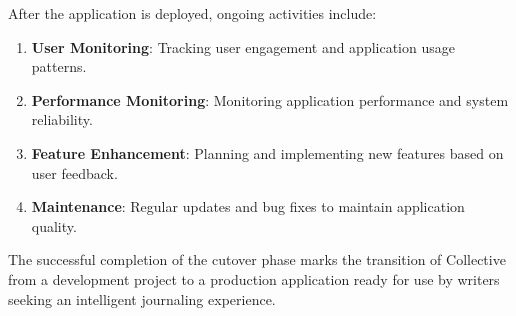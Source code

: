 After the application is deployed, ongoing activities include:

\begin{enumerate}
    \item \textbf{User Monitoring}: Tracking user engagement and application usage patterns.
    
    \item \textbf{Performance Monitoring}: Monitoring application performance and system reliability.
    
    \item \textbf{Feature Enhancement}: Planning and implementing new features based on user feedback.
    
    \item \textbf{Maintenance}: Regular updates and bug fixes to maintain application quality.
\end{enumerate}

The successful completion of the cutover phase marks the transition of Collective from a development project to a production application ready for use by writers seeking an intelligent journaling experience.